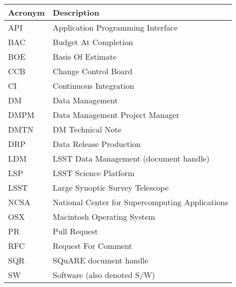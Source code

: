 \addtocounter{table}{-1}
\begin{longtable}{|l|p{}|}\hline
\textbf{Acronym} & \textbf{Description}  \\\hline

API & Application Programming Interface \\\hline
BAC & Budget At Completion \\\hline
BOE & Basis Of Estimate \\\hline
CCB & \gls{Change Control Board} \\\hline
CI & Continuous Integration \\\hline
DM & \gls{Data Management} \\\hline
DMPM & \gls{Data Management} \gls{Project Manager} \\\hline
DMTN & \gls{DM} Technical Note \\\hline
DRP & \gls{Data Release Production} \\\hline
LDM & \gls{LSST} \gls{Data Management} (document handle) \\\hline
LSP & \gls{LSST} \gls{Science Platform} \\\hline
LSST & Large Synoptic Survey Telescope \\\hline
NCSA & National \gls{Center} for Supercomputing Applications \\\hline
OSX & Macintosh Operating System \\\hline
PR & Pull Request \\\hline
RFC & Request For Comment \\\hline
SQR & SQuARE document handle \\\hline
SW & Software (also denoted S/W) \\\hline
\end{longtable}
